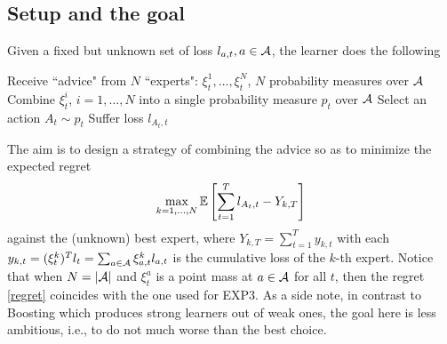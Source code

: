 \documentclass[11pt]{article}
\begin{document}
\subsection{Setup and the goal}
Given a fixed but unknown set of loss $l_{a,t},a\in \mathcal{A}$, the learner does the following
\begin{algorithmic}[1]
\STATE Receive ``advice" from $N$ ``experts": $\xi_t^1,\ldots,\xi_t^N$, $N$ probability measures over $\mathcal{A}$
\STATE Combine $\xi_t^i$, $i=1,\ldots,N$ into a single probability measure $p_t$ over $\mathcal{A}$
\STATE Select an action $A_t\sim p_t$
\STATE Suffer loss $l_{A_t,t}$
\ENDFOR
\end{algorithmic}
The aim is to design a strategy of combining the advice so as to minimize the expected regret
\begin{equation}\label{regret}
\max_{k=1,\ldots,N}\mathbb{E}\left[ \sum_{t=1}^Tl_{A_t,t}-Y_{k,T} \right]
\end{equation}
against the (unknown) best expert, where $Y_{k,T}=\sum_{t=1}^Ty_{k,t}$ with each $y_{k,t}=(\xi_t^k)^Tl_t=\sum_{a\in \mathcal{A}}\xi_{a,t}^kl_{a,t}$ is the cumulative loss of the $k$-th expert. Notice that when $N=\vert \mathcal{A}\vert $ and $\xi_t^a$ is a point mass at $a\in\mathcal{A}$ for all $t$, then the regret \eqref{regret} coincides with the one used for EXP$3$. As a side note, in contrast to Boosting which produces strong learners out of weak ones, the goal here is less ambitious, i.e., to do not much worse than the best choice.
\end{document}
